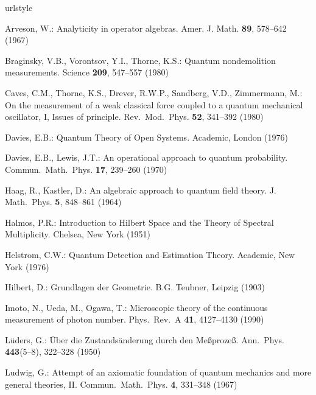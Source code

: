 \documentclass[graybox]{svmult}
\begin{document}
\begin{thebibliography}{10}
\providecommand{\url}[1]{{#1}}
\providecommand{\urlprefix}{URL }
\expandafter\ifx\csname urlstyle\endcsname\relax
  \providecommand{\doi}[1]{DOI~\discretionary{}{}{}#1}\else
  \providecommand{\doi}{DOI~\discretionary{}{}{}\begingroup
  \urlstyle{rm}\Url}\fi

Arveson, W.: Analyticity in operator algebras.
\newblock Amer. J. Math. \textbf{{89}}, 578--642 (1967)

Braginsky, V.B., Vorontsov, Y.I., Thorne, K.S.: Quantum nondemolition
  measurements.
\newblock Science \textbf{{209}}, 547--557 (1980)

Caves, C.M., Thorne, K.S., Drever, R.W.P., Sandberg, V.D., Zimmermann, M.: On
  the measurement of a weak classical force coupled to a quantum mechanical
  oscillator, {I}, {Issues} of principle.
\newblock Rev.\ Mod.\ Phys. \textbf{{52}}, 341--392 (1980)

Davies, E.B.: Quantum Theory of Open Systems.
\newblock Academic, London (1976)

Davies, E.B., Lewis, J.T.: An operational approach to quantum probability.
\newblock Commun.\ Math.\ Phys. \textbf{{17}}, 239--260 (1970)

Haag, R., Kastler, D.: An algebraic approach to quantum field theory.
\newblock J. Math.\ Phys. \textbf{{5}}, 848--861 (1964)

Halmos, P.R.: Introduction to {Hilbert} Space and the Theory of Spectral
  Multiplicity.
\newblock Chelsea, New York (1951)

Helstrom, C.W.: Quantum Detection and Estimation Theory.
\newblock Academic, New York (1976)

Hilbert, D.: Grundlagen der Geometrie.
\newblock B.G. Teubner, Leipzig (1903)

Imoto, N., Ueda, M., Ogawa, T.: Microscopic theory of the continuous
  measurement of photon number.
\newblock Phys.\ Rev.\ A \textbf{{41}}, 4127--4130 (1990)

{L\"{u}ders}, G.: \"{U}ber die {Zustands\"{a}nderung} durch den
  {Me{\ss}proze{\ss}}.
\newblock Ann.\ Phys. \textbf{443}(5--8), 322--328 (1950)

Ludwig, G.: Attempt of an axiomatic foundation of quantum mechanics and more
  general theories, {II}.
\newblock Commun.\ Math.\ Phys. \textbf{{4}}, {331--348} (1967)


\end{thebibliography}
\end{document}
